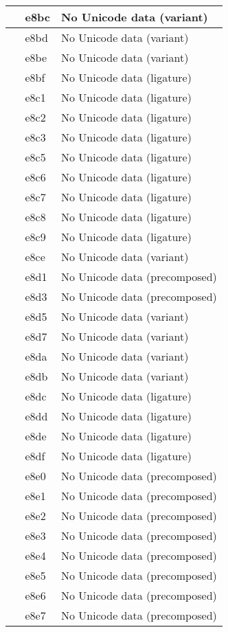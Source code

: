 \documentclass[12pt,letterpaper,openany]{book}
\begin{document}
\begin{center}
\begin{supertabular}{|m{0.25in}|m{0.5in}|m{4in}|}
 & e8bc & No Unicode data (variant)\\\hline
 & e8bd & No Unicode data (variant)\\\hline
 & e8be & No Unicode data (variant)\\\hline
 & e8bf & No Unicode data (ligature)\\\hline
 & e8c1 & No Unicode data (ligature)\\\hline
 & e8c2 & No Unicode data (ligature)\\\hline
 & e8c3 & No Unicode data (ligature)\\\hline
 & e8c5 & No Unicode data (ligature)\\\hline
 & e8c6 & No Unicode data (ligature)\\\hline
 & e8c7 & No Unicode data (ligature)\\\hline
 & e8c8 & No Unicode data (ligature)\\\hline
 & e8c9 & No Unicode data (ligature)\\\hline
 & e8ce & No Unicode data (variant)\\\hline
 & e8d1 & No Unicode data (precomposed)\\\hline
 & e8d3 & No Unicode data (precomposed)\\\hline
 & e8d5 & No Unicode data (variant)\\\hline
 & e8d7 & No Unicode data (variant)\\\hline
 & e8da & No Unicode data (variant)\\\hline
 & e8db & No Unicode data (variant)\\\hline
 & e8dc & No Unicode data (ligature)\\\hline
 & e8dd & No Unicode data (ligature)\\\hline
 & e8de & No Unicode data (ligature)\\\hline
 & e8df & No Unicode data (ligature)\\\hline
 & e8e0 & No Unicode data (precomposed)\\\hline
 & e8e1 & No Unicode data (precomposed)\\\hline
 & e8e2 & No Unicode data (precomposed)\\\hline
 & e8e3 & No Unicode data (precomposed)\\\hline
 & e8e4 & No Unicode data (precomposed)\\\hline
 & e8e5 & No Unicode data (precomposed)\\\hline
 & e8e6 & No Unicode data (precomposed)\\\hline
 & e8e7 & No Unicode data (precomposed)\\\hline

\end{supertabular}
\end{center}
\end{document}
